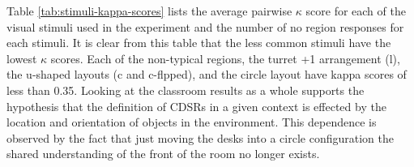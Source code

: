 \documentclass[11pt,letterpaper]{article}
\begin{document}


Table \ref{tab:stimuli-kappa-scores} lists the average pairwise $\kappa$ score for each of the visual stimuli used in the experiment and the number of no region responses for each stimuli.  It is clear from this table that the less common stimuli have the lowest $\kappa$ scores.  Each of the non-typical regions, the turret +1 arrangement (l), the u-shaped layouts (c and c-flpped), and the circle layout have kappa scores of less than 0.35. Looking at the classroom results as a whole supports the hypothesis that the definition of CDSRs in a given context is effected by the location and orientation of objects in the environment.  This dependence is observed by the fact that just moving the desks into a circle configuration the shared understanding of the front of the room no longer exists.

\end{document}

